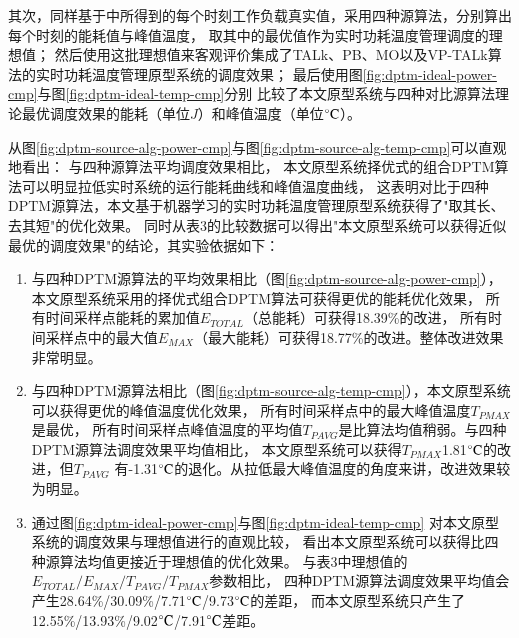 其次，同样基于中所得到的每个时刻工作负载真实值，采用四种源算法，分别算出每个时刻的能耗值与峰值温度， 取其中的最优值作为实时功耗温度管理调度的理想值； 然后使用这批理想值来客观评价集成了TALk、PB、MO以及VP-TALk算法的实时功耗温度管理原型系统的调度效果； 最后使用图\ref{fig:dptm-ideal-power-cmp}与图\ref{fig:dptm-ideal-temp-cmp}分别 比较了本文原型系统与四种对比源算法理论最优调度效果的能耗（单位$J$）和峰值温度（单位$\celsius$）。

从图\ref{fig:dptm-source-alg-power-cmp}与图\ref{fig:dptm-source-alg-temp-cmp}可以直观地看出： 与四种源算法平均调度效果相比， 本文原型系统择优式的组合DPTM算法可以明显拉低实时系统的运行能耗曲线和峰值温度曲线， 这表明对比于四种DPTM源算法，本文基于机器学习的实时功耗温度管理原型系统获得了"取其长、去其短"的优化效果。 同时从表3的比较数据可以得出"本文原型系统可以获得近似最优的调度效果"的结论，其实验依据如下：
\begin{enumerate}[1)]
\item 与四种DPTM源算法的平均效果相比（图\ref{fig:dptm-source-alg-power-cmp}）， 本文原型系统采用的择优式组合DPTM算法可获得更优的能耗优化效果， 所有时间采样点能耗的累加值$E_{TOTAL}$（总能耗）可获得18.39\%的改进， 所有时间采样点中的最大值$E_{MAX}$（最大能耗）可获得18.77\%的改进。整体改进效果非常明显。
\item 与四种DPTM源算法相比（图\ref{fig:dptm-source-alg-temp-cmp}），本文原型系统可以获得更优的峰值温度优化效果， 所有时间采样点中的最大峰值温度$T_{PMAX}$是最优， 所有时间采样点峰值温度的平均值$T_{PAVG}$是比算法均值稍弱。与四种DPTM源算法调度效果平均值相比， 本文原型系统可以获得$T_{PMAX}$1.81$\celsius$的改进，但$T_{PAVG}$ 有-1.31$\celsius$的退化。从拉低最大峰值温度的角度来讲，改进效果较为明显。
\item 通过图\ref{fig:dptm-ideal-power-cmp}与图\ref{fig:dptm-ideal-temp-cmp} 对本文原型系统的调度效果与理想值进行的直观比较， 看出本文原型系统可以获得比四种源算法均值更接近于理想值的优化效果。 与表3中理想值的$E_{TOTAL}/E_{MAX}/T_{PAVG}/T_{PMAX}$参数相比， 四种DPTM源算法调度效果平均值会产生28.64\%/30.09\%/7.71$\celsius$/9.73$\celsius$的差距， 而本文原型系统只产生了12.55\%/13.93\%/9.02$\celsius$/7.91$\celsius$差距。
\end{enumerate}

